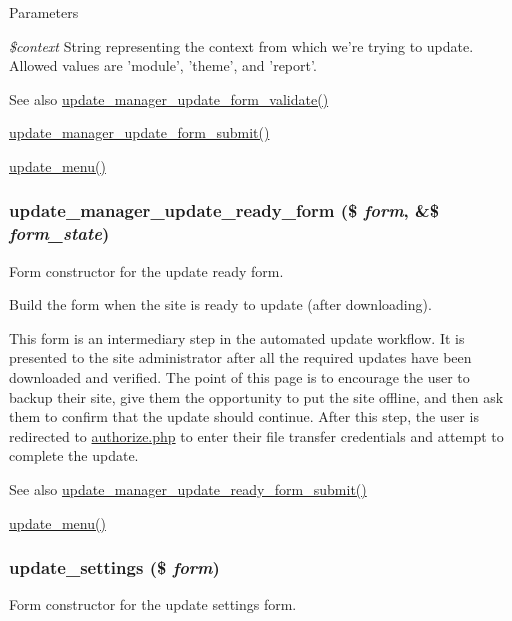 \begin{DoxyParams}{Parameters}
\item[{\em \$context}]String representing the context from which we're trying to update. Allowed values are 'module', 'theme', and 'report'.\end{DoxyParams}
\begin{DoxySeeAlso}{See also}
\hyperlink{group__update__manager__update_ga578871dbee92e6bcb2f48ba232554c27}{update\_\-manager\_\-update\_\-form\_\-validate()} 

\hyperlink{group__update__manager__update_gaec3a60b324711da2e658cf10d9b85447}{update\_\-manager\_\-update\_\-form\_\-submit()} 

\hyperlink{update_8module_abfea1a759334c0461fa9ff2250bdfaaf}{update\_\-menu()} 
\end{DoxySeeAlso}
\hypertarget{group__forms_gab1105c1314e1bd8822eef3cb16f78b26}{
\subsubsection[{update\_\-manager\_\-update\_\-ready\_\-form}]{\setlength{\rightskip}{0pt plus 5cm}update\_\-manager\_\-update\_\-ready\_\-form (\$ {\em form}, \/  \&\$ {\em form\_\-state})}}
\label{group__forms_gab1105c1314e1bd8822eef3cb16f78b26}
Form constructor for the update ready form.

Build the form when the site is ready to update (after downloading).

This form is an intermediary step in the automated update workflow. It is presented to the site administrator after all the required updates have been downloaded and verified. The point of this page is to encourage the user to backup their site, give them the opportunity to put the site offline, and then ask them to confirm that the update should continue. After this step, the user is redirected to \hyperlink{authorize_8php}{authorize.php} to enter their file transfer credentials and attempt to complete the update.

\begin{DoxySeeAlso}{See also}
\hyperlink{group__update__manager__update_gaeab4690bf95cb0d0b517a0b9161e5045}{update\_\-manager\_\-update\_\-ready\_\-form\_\-submit()} 

\hyperlink{update_8module_abfea1a759334c0461fa9ff2250bdfaaf}{update\_\-menu()} 
\end{DoxySeeAlso}
\hypertarget{group__forms_gaef8e4ae13223ebb2175505c22c6f6fa8}{
\subsubsection[{update\_\-settings}]{\setlength{\rightskip}{0pt plus 5cm}update\_\-settings (\$ {\em form})}}
\label{group__forms_gaef8e4ae13223ebb2175505c22c6f6fa8}
Form constructor for the update settings form.

